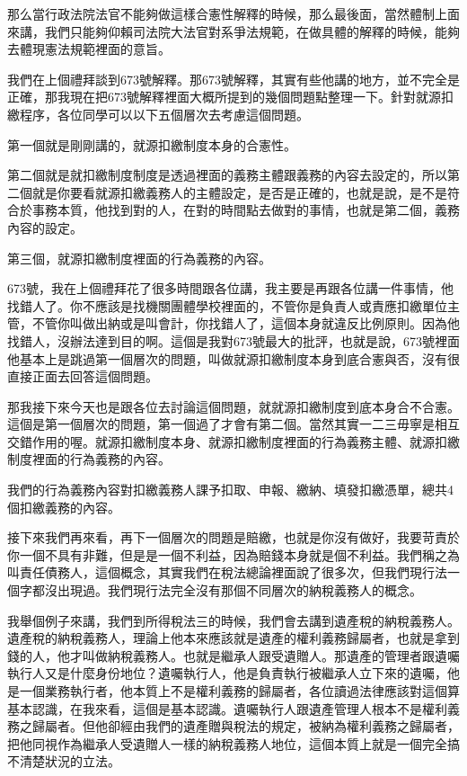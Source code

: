 \documentclass[oneside,sub3section]{ctexbook}
\begin{document}
那么當行政法院法官不能夠做這樣合憲性解釋的時候，那么最後面，當然體制上面來講，我們只能夠仰賴司法院大法官對系爭法規範，在做具體的解釋的時候，能夠去體現憲法規範裡面的意旨。

我們在上個禮拜談到673號解釋。那673號解釋，其實有些他講的地方，並不完全是正確，那我現在把673號解釋裡面大概所提到的幾個問題點整理一下。針對就源扣繳程序，各位同學可以以下五個層次去考慮這個問題。

第一個就是剛剛講的，就源扣繳制度本身的合憲性。

第二個就是就扣繳制度制度是透過裡面的義務主體跟義務的內容去設定的，所以第二個就是你要看就源扣繳義務人的主體設定，是否是正確的，也就是說，是不是符合於事務本質，他找到對的人，在對的時間點去做對的事情，也就是第二個，義務內容的設定。

第三個，就源扣繳制度裡面的行為義務的內容。

673號，我在上個禮拜花了很多時間跟各位講，我主要是再跟各位講一件事情，他找錯人了。你不應該是找機關團體學校裡面的，不管你是負責人或責應扣繳單位主管，不管你叫做出納或是叫會計，你找錯人了，這個本身就違反比例原則。因為他找錯人，沒辦法達到目的啊。這個是我對673號最大的批評，也就是說，673號裡面他基本上是跳過第一個層次的問題，叫做就源扣繳制度本身到底合憲與否，沒有很直接正面去回答這個問題。

那我接下來今天也是跟各位去討論這個問題，就就源扣繳制度到底本身合不合憲。這個是第一個層次的問題，第一個過了才會有第二個。當然其實一二三毋寧是相互交錯作用的喔。就源扣繳制度本身、就源扣繳制度裡面的行為義務主體、就源扣繳制度裡面的行為義務的內容。

我們的行為義務內容對扣繳義務人課予扣取、申報、繳納、填發扣繳憑單，總共4個扣繳義務的內容。

接下來我們再來看，再下一個層次的問題是賠繳，也就是你沒有做好，我要苛責於你一個不具有非難，但是是一個不利益，因為賠錢本身就是個不利益。我們稱之為叫責任債務人，這個概念，其實我們在稅法總論裡面說了很多次，但我們現行法一個字都沒出現過。我們現行法完全沒有那個不同層次的納稅義務人的概念。

我舉個例子來講，我們到所得稅法三的時候，我們會去講到遺產稅的納稅義務人。遺產稅的納稅義務人，理論上他本來應該就是遺產的權利義務歸屬者，也就是拿到錢的人，他才叫做納稅義務人。也就是繼承人跟受遺贈人。那遺產的管理者跟遺囑執行人又是什麼身份地位？遺囑執行人，他是負責執行被繼承人立下來的遺囑，他是一個業務執行者，他本質上不是權利義務的歸屬者，各位讀過法律應該對這個算基本認識，在我來看，這個是基本認識。遺囑執行人跟遺產管理人根本不是權利義務之歸屬者。但他卻經由我們的遺產贈與稅法的規定，被納為權利義務之歸屬者，把他同視作為繼承人受遺贈人一樣的納稅義務人地位，這個本質上就是一個完全搞不清楚狀況的立法。
\end{document}
